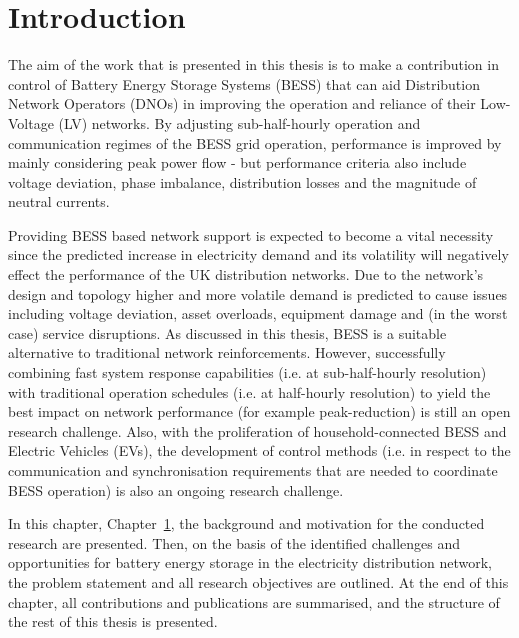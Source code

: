 \chapter{Introduction}
\label{ch-introduction}

The aim of the work that is presented in this thesis is to make a contribution in control of Battery Energy Storage Systems (BESS) that can aid Distribution Network Operators (DNOs) in improving the operation and reliance of their Low-Voltage (LV) networks.
By adjusting sub-half-hourly operation and communication regimes of the BESS grid operation, performance is improved by mainly considering peak power flow - but performance criteria also include voltage deviation, phase imbalance, distribution losses and the magnitude of neutral currents.

Providing BESS based network support is expected to become a vital necessity since the predicted increase in electricity demand and its volatility will negatively effect the performance of the UK distribution networks.
Due to the network's design and topology higher and more volatile demand is predicted to cause issues including voltage deviation, asset overloads, equipment damage and (in the worst case) service disruptions.
As discussed in this thesis, BESS is a suitable alternative to traditional network reinforcements.
However, successfully combining fast system response capabilities (i.e. at sub-half-hourly resolution) with traditional operation schedules (i.e. at half-hourly resolution) to yield the best impact on network performance (for example peak-reduction) is still an open research challenge.
Also, with the proliferation of household-connected BESS and Electric Vehicles (EVs), the development of control methods (i.e. in respect to the communication and synchronisation requirements that are needed to coordinate BESS operation) is also an ongoing research challenge.

In this chapter, Chapter~\ref{ch-introduction}, the background and motivation for the conducted research are presented.
Then, on the basis of the identified challenges and opportunities for battery energy storage in the electricity distribution network, the problem statement and all research objectives are outlined.
At the end of this chapter, all contributions and publications are summarised, and the structure of the rest of this thesis is presented.









